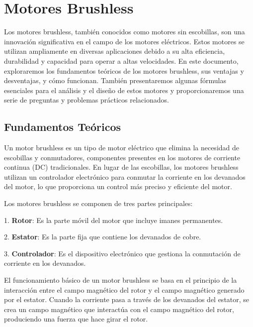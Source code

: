 \documentclass[../main]{subfiles}
\begin{document}
\section*{Motores Brushless}

Los motores brushless, también conocidos como motores sin escobillas, son una innovación significativa en el campo de los motores eléctricos. Estos motores se utilizan ampliamente en diversas aplicaciones debido a su alta eficiencia, durabilidad y capacidad para operar a altas velocidades. En este documento, exploraremos los fundamentos teóricos de los motores brushless, sus ventajas y desventajas, y cómo funcionan. También presentaremos algunas fórmulas esenciales para el análisis y el diseño de estos motores y proporcionaremos una serie de preguntas y problemas prácticos relacionados.

\subsection*{Fundamentos Teóricos}

Un motor brushless es un tipo de motor eléctrico que elimina la necesidad de escobillas y conmutadores, componentes presentes en los motores de corriente continua (DC) tradicionales. En lugar de las escobillas, los motores brushless utilizan un controlador electrónico para conmutar la corriente en los devanados del motor, lo que proporciona un control más preciso y eficiente del motor.

Los motores brushless se componen de tres partes principales:

1. \textbf{Rotor}: Es la parte móvil del motor que incluye imanes permanentes.

2. \textbf{Estator}: Es la parte fija que contiene los devanados de cobre.

3. \textbf{Controlador}: Es el dispositivo electrónico que gestiona la conmutación de corriente en los devanados.

El funcionamiento básico de un motor brushless se basa en el principio de la interacción entre el campo magnético del rotor y el campo magnético generado por el estator. Cuando la corriente pasa a través de los devanados del estator, se crea un campo magnético que interactúa con el campo magnético del rotor, produciendo una fuerza que hace girar el rotor.
\end{document}
